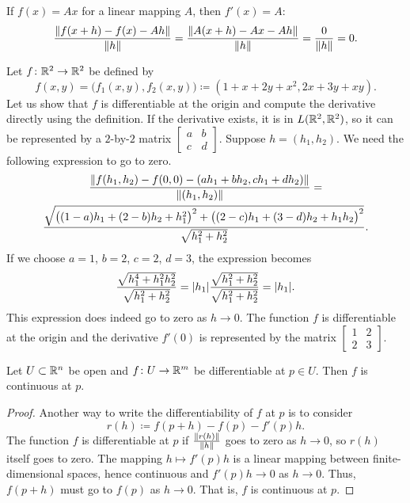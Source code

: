 \begin{example}
If $f(x) = Ax$ for a linear mapping $A$, then
$f'(x) = A$:
\begin{equation*}
\frac{\lVert {f(x+h)-f(x) - Ah} \rVert}{\lVert {h} \rVert}
=
\frac{\lVert {A(x+h)-Ax - Ah} \rVert}{\lVert {h} \rVert}
=
\frac{0}{\lVert {h} \rVert} = 0 .
\end{equation*}
\end{example}

\begin{example}
Let $f \colon {\mathbb{R}}^2 \to {\mathbb{R}}^2$ be defined by
\begin{equation*}
f(x,y) = \bigl(f_1(x,y),f_2(x,y)\bigr) \coloneqq (1+x+2y+x^2,2x+3y+xy).
\end{equation*}
Let us show that $f$ is differentiable at the origin and
compute the derivative directly using the definition.
If the derivative exists, it is in $L({\mathbb{R}}^2,{\mathbb{R}}^2)$, so it can be
represented by a $2$-by-$2$ matrix
$\left[\begin{smallmatrix}a&b\\c&d\end{smallmatrix}\right]$.  Suppose $h =
(h_1,h_2)$.  We need the following expression to go to zero.
\begin{multline*}
\frac{\lVert {
f(h_1,h_2)-f(0,0)
-
(ah_1 +bh_2 , ch_1+dh_2)} \rVert
}{\lVert {(h_1,h_2)} \rVert}
=
\\
\frac{\sqrt{
{\bigl((1-a)h_1 + (2-b)h_2 + h_1^2\bigr)}^2
+
{\bigl((2-c)h_1 + (3-d)h_2 + h_1h_2\bigr)}^2}}{\sqrt{h_1^2+h_2^2}} .
\end{multline*}
If we choose $a=1$, $b=2$, $c=2$, $d=3$, the expression becomes
\begin{equation*}
\frac{\sqrt{
h_1^4 + h_1^2h_2^2}}{\sqrt{h_1^2+h_2^2}}
=
\lvert {h_1} \rvert
\frac{\sqrt{
h_1^2 + h_2^2}}{\sqrt{h_1^2+h_2^2}}
= \lvert {h_1} \rvert .
\end{equation*}
This expression does indeed go to zero as $h \to 0$.  The
function $f$ is differentiable at the origin and 
the derivative $f'(0)$ is represented by the matrix
$\left[\begin{smallmatrix}1&2\\2&3\end{smallmatrix}\right]$.
\end{example}

\begin{prop}
Let $U \subset {\mathbb{R}}^n$ be open and $f \colon U \to {\mathbb{R}}^m$ be
differentiable at $p \in U$.  Then $f$ is continuous at $p$.
\end{prop}

\begin{proof}
Another way to write the differentiability of $f$ at $p$ is to consider
\begin{equation*}
r(h) \coloneqq f(p+h)-f(p) - f'(p) h .
\end{equation*}
The function $f$ is differentiable at $p$ if
$\frac{\lVert {r(h)} \rVert}{\lVert {h} \rVert}$ goes to zero as $h \to 0$,
so
$r(h)$ itself goes to zero.  The mapping $h \mapsto f'(p) h$
is a linear mapping between finite-dimensional spaces, hence continuous
and $f'(p) h \to 0$ as $h \to 0$.  Thus,
$f(p+h)$ must go to $f(p)$ as $h \to 0$.  That is, $f$ is continuous at $p$.
\end{proof}


